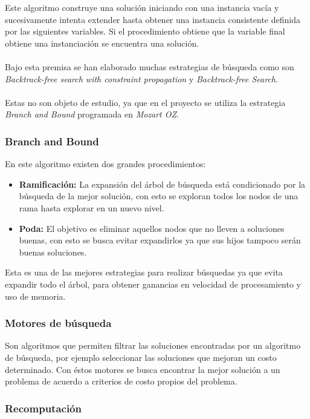 Este algoritmo construye una solución iniciando con una instancia vacía y sucesivamente intenta extender hasta obtener una instancia consistente definida por las siguientes variables. Si el procedimiento obtiene que la variable final obtiene una instanciación se encuentra una solución.
\\\\
Bajo esta premisa se han elaborado muchas estrategias de búsqueda como son \textit{Backtrack-free search with constraint propagation} y \textit{Backtrack-free Search}.
\\\\
Estas no son objeto de estudio, ya que en el proyecto se utiliza la estrategia \textit{Branch and Bound} programada en \textit{Mozart OZ}.

\subsubsection{Branch and Bound}

En este algoritmo existen dos grandes procedimientos:

\begin{itemize}
	\item \textbf{Ramificación:} La expansión del árbol de búsqueda está condicionado por la búsqueda de la mejor solución, con esto se exploran todos los nodos de una rama hasta explorar en un nuevo nivel.
	\item \textbf{Poda:} El objetivo es eliminar aquellos nodos que no lleven a soluciones buenas, con esto se busca evitar expandirlos ya que sus hijos tampoco serán buenas soluciones.
\end{itemize}

Esta es una de las mejores estrategias para realizar búsquedas ya que evita expandir todo el árbol, para obtener ganancias en velocidad de procesamiento y uso de memoria.

\subsubsection{Motores de búsqueda}

Son algoritmos que permiten filtrar las soluciones encontradas por un algoritmo de búsqueda, por ejemplo seleccionar las soluciones que mejoran un costo determinado. Con éstos motores se busca encontrar la mejor solución a un problema de acuerdo a criterios de costo propios del problema.

\subsubsection{Recomputación}


